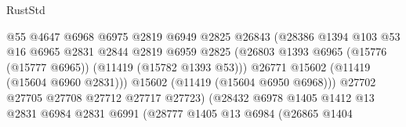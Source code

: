 \begin{lexlean}{RustStd}
\begin{coremodule}
                                            @55
                                            @4647
                                            @6968
                                            @6975
                                            @2819
                                            @6949
                                            @2825
                                            @26843
                                            (@28386
                                              @1394
                                              @103
                                              @53
                                              @16
                                              @6965
                                              @2831
                                              @2844
                                              @2819
                                              @6959
                                              @2825
                                              (@26803
                                                @1393
                                                @6965
                                                (@15776 (@15777 @6965))
                                                (@11419 (@15782 @1393 @53)))
                                              @26771
                                              @15602
                                              (@11419 (@15604 @6960 @2831)))
                                            @15602
                                            (@11419 (@15604 @6950 @6968)))
                                          @27702
                                          @27705
                                          @27708
                                          @27712
                                          @27717
                                          @27723)
                                        (@28432
                                          @6978
                                          @1405
                                          @1412
                                          @13
                                          @2831
                                          @6984
                                          @2831
                                          @6991
                                          (@28777
                                            @1405
                                            @13
                                            @6984
                                            (@26865
                                              @1404

\end{coremodule}
\end{lexlean}
